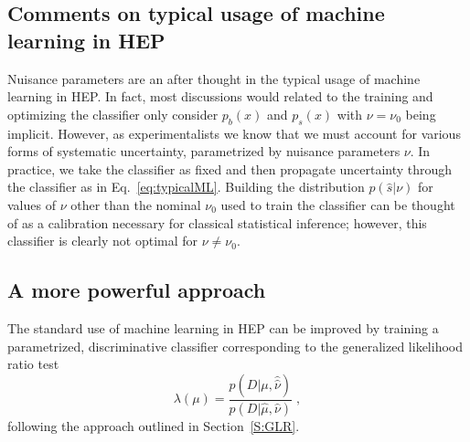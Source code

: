 \documentclass[11pt, oneside]{article}   	%
\begin{document}
\subsection{Comments on typical usage of machine learning in HEP}

Nuisance parameters are an after thought in the typical usage of machine learning in HEP. In fact, most discussions would related to the training and optimizing the classifier only consider $p_b(x)$ and $p_s(x)$ with $\nu=\nu_0$ being implicit. However, as experimentalists we know that we must account for various forms of systematic uncertainty, parametrized by nuisance parameters $\nu$. In practice, we take the classifier as fixed and then propagate uncertainty through the classifier as in Eq.~\ref{eq:typicalML}. Building the distribution $p(\hat s|\nu)$ for values of $\nu$ other than the nominal $\nu_0$ used to train the classifier can be thought of as a calibration necessary for classical statistical inference; however, this classifier is clearly not optimal for $\nu \ne \nu_0$.

\subsection{A more powerful  approach}

The standard use of machine learning in HEP can be improved by training a parametrized, discriminative classifier corresponding to the generalized likelihood ratio test 
\begin{equation}
\lambda(\mu) = \frac{p(D|\mu, \hat{\hat{\nu}})}{p(D|\hat \mu, {\hat{\nu}})} \;,
\end{equation}
following the approach outlined in Section~\ref{S:GLR}. 
\end{document}
